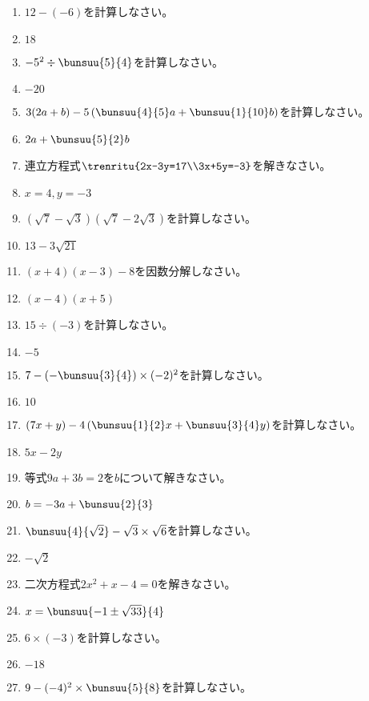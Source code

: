 \documentclass[uplatex,a4j,11pt]{jsreport}
\begin{document}
\begin{multicols}{2}
\begin{enumerate}
    \item $12-(-6)$\quad を計算しなさい。%
    \item $18$
    \item $-5^2\div \bunsuu{5}{4}$\quad を計算しなさい。%
    \item $-20$
    \item $3(2a+b)-5\left(\bunsuu{4}{5}a+\bunsuu{1}{10}b\right)$\quad を計算しなさい。%
    \item $2a+\bunsuu{5}{2}b$
    \item 連立方程式\quad$\trenritu{2x-3y=17\\3x+5y=-3}$\quad を解きなさい。%
    \item $x=4, y=-3$
    \item $(\sqrt{7}-\sqrt{3})(\sqrt{7}-2\sqrt{3})$\quad を計算しなさい。%
    \item $13-3\sqrt{21}$
    \item $(x+4)(x-3)-8$\quad を因数分解しなさい。%
    \item $(x-4)(x+5)$
    \item $15\div (-3)$\quad を計算しなさい。%
    \item $-5$
    \item $7-\left(-\bunsuu{3}{4}\right)\times (-2)^2$\quad を計算しなさい。%
    \item $10$
    \item $(7x+y)-4\left(\bunsuu{1}{2}x+\bunsuu{3}{4}y\right)$\quad を計算しなさい。%
    \item $5x-2y$
    \item 等式\quad$9a+3b=2$\quad を\quad$b$\quad について解きなさい。%
    \item $b=-3a+\bunsuu{2}{3}$
    \item $\bunsuu{4}{\sqrt{2}}-\sqrt{3}\times \sqrt{6}$\quad を計算しなさい。%
    \item $-\sqrt{2}$
    \item 二次方程式\quad$2x^2+x-4=0$\quad を解きなさい。%
    \item $x=\bunsuu{-1\pm\sqrt{33}}{4}$
    \item $6\times (-3)$\quad を計算しなさい。%
    \item $-18$
    \item $9-(-4)^2\times \bunsuu{5}{8}$\quad を計算しなさい。%

\end{enumerate}
\end{multicols}
\end{document}
